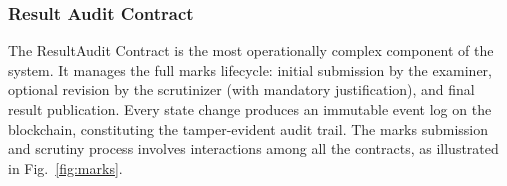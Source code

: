 \documentclass[conference]{IEEEtran}
\begin{document}
\subsubsection{Result Audit Contract}
\label{subsec:resultaudit}

The ResultAudit Contract is the most operationally complex component of the
system. It manages the full marks lifecycle: initial submission by the
examiner, optional revision by the scrutinizer (with mandatory justification),
and final result publication. Every state change produces an immutable event
log on the blockchain, constituting the tamper-evident audit trail. The marks submission and scrutiny process involves interactions among all the contracts, as illustrated in Fig.~\ref{fig:marks}.







\end{document}
